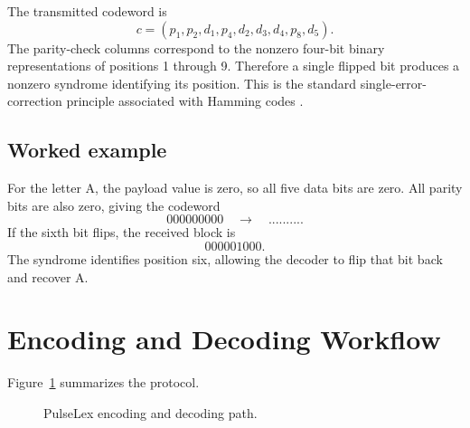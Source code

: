 \documentclass[11pt,a4paper]{article}
\begin{document}
The transmitted codeword is
\[
  c=(p_1,p_2,d_1,p_4,d_2,d_3,d_4,p_8,d_5).
\]
The parity-check columns correspond to the nonzero four-bit binary
representations of positions 1 through 9. Therefore a single flipped bit
produces a nonzero syndrome identifying its position. This is the standard
single-error-correction principle associated with Hamming codes
\cite{hamming1950}.

\subsection{Worked example}
For the letter A, the payload value is zero, so all five data bits are zero.
All parity bits are also zero, giving the codeword
\[
  000000000 \quad \longrightarrow \quad \texttt{.........}.
\]
If the sixth bit flips, the received block is
\[
  000001000.
\]
The syndrome identifies position six, allowing the decoder to flip that bit
back and recover A.

\section{Encoding and Decoding Workflow}
Figure~\ref{fig:workflow} summarizes the protocol.

\begin{figure}[h]
\centering
{}
\caption{PulseLex encoding and decoding path.}
\label{fig:workflow}
\end{figure}
\end{document}
